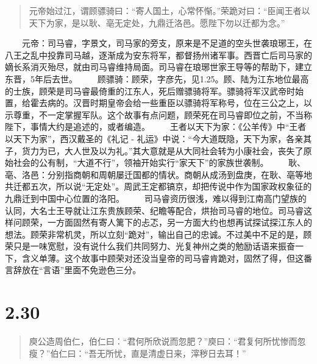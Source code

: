 \documentclass[]{book}
\begin{document}
\begin{quote}
元帝始过江，谓顾骠骑曰：``寄人国土，心常怀惭。''荣跪对曰：``臣闻王者以天下为家，是以耿、亳无定处，九鼎迁洛邑。愿陛下勿以迁都为念。''
\end{quote}

　　元帝：司马睿，字景文，司马家的旁支，原来是不足道的空头世袭琅琊王，在八王之乱中投靠司马越，逐渐成为安东将军，都督扬州诸军事。西晋亡后司马家的嫡长系消灭殆尽，就由司马睿维持局面。司马睿在琅琊世家王导等的帮助下，建立东晋，5年后去世。
　　顾骠骑：顾荣，字彦先，见1.25。顾、陆为江东地位最高的士族，顾荣是司马睿最倚重的江东人，死后赠骠骑将军。骠骑将军汉武帝时始置，给霍去病的。汉晋时期皇帝会给一些重臣以骠骑将军称号，位在三公之上，以示尊重，不一定掌握军队。这个故事有点问题，顾荣死在司马睿即位之前，不当称陛下，事情大约是追述的，或者编造。
　　王者以天下为家：《公羊传》中``王者以天下为家''，西汉戴圣的《礼记 -
礼运》中说：``今大道既隐，天下为家，各亲其子，货力为已，大人世及以为礼。''其大意就是从大同社会转为小康社会，丧失了原始社会的公有制，``大道不行''，领袖开始实行``家天下''的家族世袭制。
　　耿、亳、洛邑：分别指商朝和周朝屡迁国都的情状。商朝从成汤到盘庚，在耿、亳等地共迁都五次，所以说``无定处''。周武王定都镐京，却把传说中作为国家政权象征的九鼎迁到中国中心位置的洛阳。
　　司马睿资历很浅，难以得到江南高门望族的认同，大名士王导就让江东贵族顾荣、纪瞻等配合，烘抬司马睿的地位。司马睿这样问顾荣，一方面固然有寄人篱下的忐忑，另一方面大约也想再试探试探江东人的想法。顾荣非常机灵，所以立刻``跪对''，输出自己的忠诚。不过美中不足的是，顾荣只是一味宽慰，没有说什么我们共同努力、光复神州之类的勉励话语来振奋一下，含义单薄。这个故事中顾荣对还没当皇帝的司马睿肯跪对，固然了得，但这番言辞放在``言语''里面不免逊色三分。

\section{2.30}\label{section-76}

\begin{quote}
庾公造周伯仁，伯仁曰：``君何所欣说而忽肥？''庾曰：``君复何所忧惨而忽瘦？''伯仁曰：``吾无所忧，直是清虚日来，滓秽日去耳！''
\end{quote}
\end{document}
